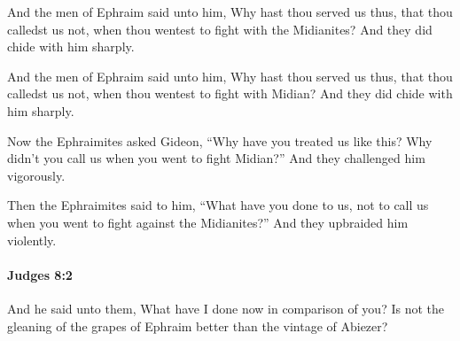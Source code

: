 			And the men of Ephraim said unto him, Why hast thou served us thus, that thou calledst us not, when thou wentest to fight with the Midianites? And they did chide with him sharply.

			\begin{versebox}
					\item[BHS] 
					\item[ASV] And the men of Ephraim said unto him, Why hast thou served us thus, that thou calledst us not, when thou wentest to fight with Midian? And they did chide with him sharply.
					\item[NIV] Now the Ephraimites asked Gideon, “Why have you treated us like this? Why didn’t you call us when you went to fight Midian?” And they challenged him vigorously.
					\item[NRSV] Then the Ephraimites said to him, “What have you done to us, not to call us when you went to fight against the Midianites?” And they upbraided him violently.
			\end{versebox}

		\paragraph{Judges 8:2} %
			\label{JUDGES-8-2}

			And he said unto them, What have I done now in comparison of you? Is not the gleaning of the grapes of Ephraim better than the vintage of Abiezer?

